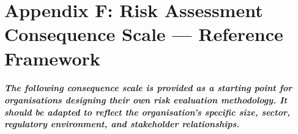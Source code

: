 \chapter*{Appendix F: Risk Assessment Consequence Scale — Reference Framework}
\label{chap:Appendix F: Risk Assessment Consequence Scale — Reference Framework}

\paragraph{The following consequence scale is provided as a starting point for organisations designing their own risk evaluation methodology. It should be adapted to reflect the organisation's specific size, sector, regulatory environment, and stakeholder relationships.}

